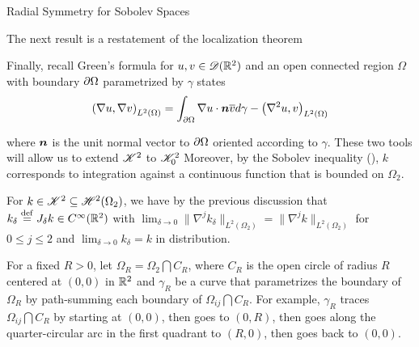 \begin{chapter}{Radial Symmetry for Sobolev Spaces}
\begin{com}
The next result is a restatement of the localization theorem 

Finally, recall Green's formula for $u,v \in \mathscr D(\mathbb R^2)$ and an open connected region $\Omega$ with boundary $\partial \Omega$ parametrized by $\gamma$ states
\begin{equation}
  \left(\nabla u, \nabla v\right)_{L^2(\Omega)} %
    = \int_{\del \Omega} \nabla u \cdot \vect n \bar{v} d\gamma - \left(\nabla^2 u, v \right)_{L^2(\Omega)} 
\end{equation}



where $\mbox{\boldmath$n$}$ is the unit normal vector to $\partial\Omega$ oriented according to $\gamma$.
These two tools will allow us to extend $\mathscr K^2$ to $\mathscr K^2_0$ 
Moreover, by the Sobolev inequality (), $k$ corresponds to integration against a continuous function that is bounded on $\Omega_2$.

For $k \in \mathscr K^2 \subseteq \mathscr H^2(\Omega_2)$, we have by the previous discussion that $k_\delta \stackrel{\rm def}{=} J_\delta k \in C^{\infty}(\mathbb R^2)$ 
with $\lim_{\delta\to0}\|\nabla^j k_\delta \|_{L^2(\Omega_2)} = \|\nabla^j k\|_{L^2(\Omega_2)}$ for $0\le j\le 2$ and $\lim_{\delta \to 0} k_\delta = k$ in distribution.


For a fixed $R>0$, let $\Omega_R = \Omega_2 \bigcap C_R$, where $C_R$ is the open circle of radius $R$ centered at $(0,0)$ in $\mathbb R^2$ and $\gamma_R$ be a curve that parametrizes the boundary of $\Omega_R$ by path-summing each boundary of $\Omega_{ij} \bigcap C_R$. 
For example, $\gamma_R$ traces $\Omega_{ij}\bigcap C_R$ by starting at $(0,0)$, then goes to $(0,R)$, then goes along the quarter-circular arc in the first quadrant to $(R,0)$, then goes back to $(0,0)$. 


\end{com}
\end{chapter}
